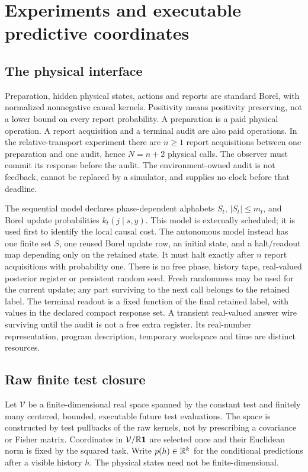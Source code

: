 \section{Experiments and executable predictive coordinates}\label{sec:experiments}
\subsection{The physical interface}
Preparation, hidden physical states, actions and reports are standard Borel, with normalized nonnegative causal kernels. Positivity means positivity preserving, not a lower bound on every report probability. A preparation is a paid physical operation. A report acquisition and a terminal audit are also paid operations. In the relative-transport experiment there are $n\ge1$ report acquisitions between one preparation and one audit, hence $N=n+2$ physical calls. The observer must commit its response before the audit. The environment-owned audit is not feedback, cannot be replaced by a simulator, and supplies no clock before that deadline.

The sequential model declares phase-dependent alphabets $S_t$, $|S_t|\le m_t$, and Borel update probabilities $k_t(j\mid s,y)$. This model is externally scheduled; it is used first to identify the local causal cost. The autonomous model instead has one finite set $S$, one reused Borel update row, an initial state, and a halt/readout map depending only on the retained state. It must halt exactly after $n$ report acquisitions with probability one. There is no free phase, history tape, real-valued posterior register or persistent random seed. Fresh randomness may be used for the current update; any part surviving to the next call belongs to the retained label. The terminal readout is a fixed function of the final retained label, with values in the declared compact response set. A transient real-valued answer wire surviving until the audit is not a free extra register. Its real-number representation, program description, temporary workspace and time are distinct resources.

\subsection{Raw finite test closure}
Let $\mathcal V$ be a finite-dimensional real space spanned by the constant test and finitely many centered, bounded, executable future test evaluations. The space is constructed by test pullbacks of the raw kernels, not by prescribing a covariance or Fisher matrix. Coordinates in $\mathcal V/\mathbb R\mathbf 1$ are selected once and their Euclidean norm is fixed by the squared task. Write $p(h)\in\mathbb R^k$ for the conditional predictions after a visible history $h$. The physical states need not be finite-dimensional.

